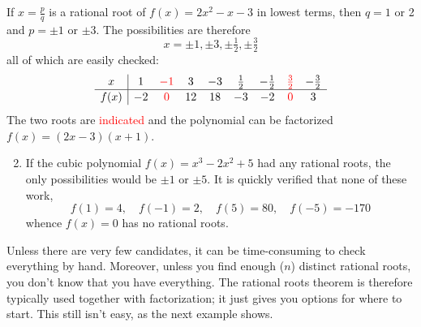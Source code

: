 \begin{examples}{}{}
	\exstart If $x=\frac pq$ is a rational root of $f(x)=2x^2-x-3$ in lowest terms, then $q=1$ or 2 and $p=\pm 1$ or $\pm 3$. The possibilities are therefore
	\[
		x=\pm 1,\pm 3,\pm\tfrac 12,\pm\tfrac 32
	\]
	all of which are easily checked:
	\[
		\def\arraystretch{1.1}
		\begin{array}{c|cccccccc}
			x&1&\textcolor{red}{-1}&3&-3&\frac 12&-\frac 12&\textcolor{red}{\frac 32}&-\frac 32\\\hline
			f(x)&-2&\textcolor{red}{0}&12&18&-3&-2&\textcolor{red}{0}&3
		\end{array}
	\]
	The two roots are \textcolor{red}{indicated} and the polynomial can be factorized $f(x)=(2x-3)(x+1)$.
	\begin{enumerate}\setcounter{enumi}{1}
	  \item If the cubic polynomial $f(x)=x^3-2x^2+5$ had any rational roots, the only possibilities would be $\pm 1$ or $\pm 5$. It is quickly verified that none of these work,
	  \[
	  	f(1)=4,\quad f(-1)=2,\quad f(5)=80,\quad f(-5)=-170
	  \]
	  whence $f(x)=0$ has no rational roots.
	\end{enumerate}
\end{examples}

Unless there are very few candidates, it can be time-consuming to check everything by hand. Moreover, unless you find enough ($n$) distinct rational roots, you don't know that you have everything. The rational roots theorem is therefore typically used together with factorization; it just gives you options for where to start. This still isn't easy, as the next example shows.


\goodbreak


